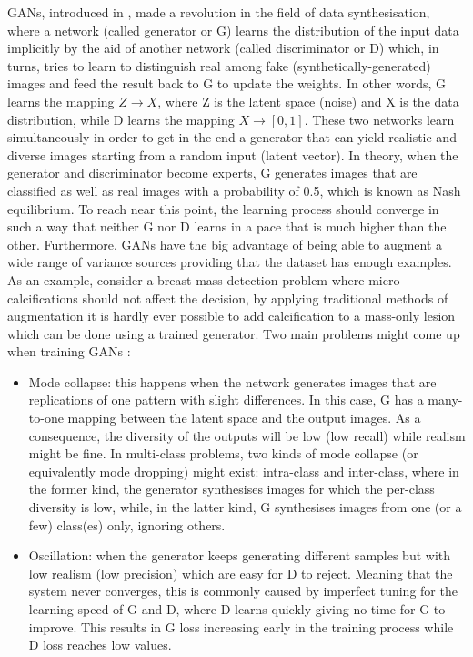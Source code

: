 \documentclass[final,3p,twocolumn,authoryear,sort&compress,times]{maia}
\begin{document}
GANs, introduced in \citet{GAN}, made a revolution in the field of data synthesisation, where a network (called generator or G) learns the distribution of the input data implicitly by the aid of another network (called discriminator or D) which, in turns, tries to learn to distinguish real among fake (synthetically-generated) images and feed the result back to G to update the weights. In other words, G learns the mapping $Z \to X$, where Z is the latent space (noise) and X is the data distribution, while D learns the mapping $X \to [0,1]$. These two networks learn simultaneously in order to get in the end a generator that can yield realistic and diverse images starting from a random input (latent vector). In theory, when the generator and discriminator become experts, G generates images that are classified as well as real images with a probability of 0.5, which is known as Nash equilibrium. To reach near this point, the learning process should converge in such a way that neither G nor D learns in a pace that is much higher than the other. Furthermore, GANs have the big advantage of being able to augment a wide range of variance sources providing that the dataset has enough examples. As an example, consider a breast mass detection problem where micro calcifications should not affect the decision, by applying traditional methods of augmentation it is hardly ever possible to add calcification to a mass-only lesion which can be done using a trained generator.
Two main problems might come up when training GANs \citep{nips2016}:
\begin{itemize}
    \item Mode collapse: this happens when the network generates images that are replications of one pattern with slight differences. In this case, G has a many-to-one mapping between the latent space and the output images. As a consequence, the diversity of the outputs will be low (low recall) while realism might be fine. In multi-class problems, two kinds of mode collapse (or equivalently mode dropping) might exist: intra-class and inter-class, where in the former kind, the generator synthesises images for which the per-class diversity is low, while, in the latter kind, G synthesises images from one (or a few) class(es) only, ignoring others.
    \item Oscillation: when the generator keeps generating different samples but with low realism (low precision) which are easy for D to reject. Meaning that the system never converges, this is commonly caused by imperfect tuning for the learning speed of G and D, where D learns quickly giving no time for G to improve. This results in G loss increasing early in the training process while D loss reaches low values.

\end{itemize}
\end{document}
